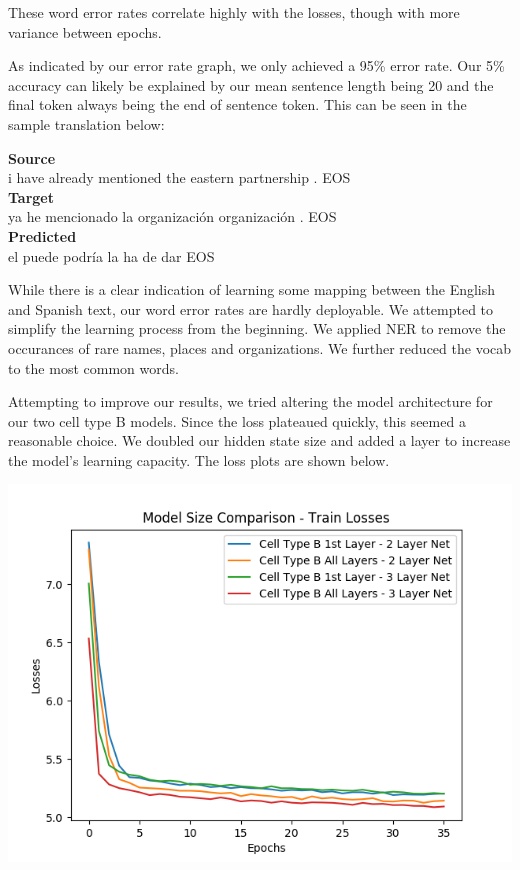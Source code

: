 \documentclass[letterpaper, 10pt]{article}
\begin{document}
\begin{multicols}{2}
These word error rates correlate highly with the losses, though with more variance between epochs.

As indicated by our error rate graph, we only achieved a 95\% error rate.
Our 5\% accuracy can likely be explained by our mean sentence length being 20 and the final token
always being the end of sentence token.
This can be seen in the sample translation below:

\bigskip
\noindent \textbf{Source}\\
i have already mentioned the eastern partnership . EOS\\
\textbf{Target}\\
ya he mencionado la organización organización . EOS\\
\textbf{Predicted}\\
el puede podría la ha de dar EOS
\bigskip

While there is a clear indication of learning some mapping between the English and Spanish text,
our word error rates are hardly deployable.
We attempted to simplify the learning process from the beginning.
We applied NER to remove the occurances of rare names, places and organizations.
We further reduced the vocab to the most common words.

Attempting to improve our results, we tried altering the model architecture for our two cell type B models.
Since the loss plateaued quickly, this seemed a reasonable choice.
We doubled our hidden state size and added a layer to increase the model's learning capacity.
The loss plots are shown below.

\begin{center}
\includegraphics[scale=.4]{size_comparison_losses_train}
\end{center}


\end{multicols}
\end{document}
